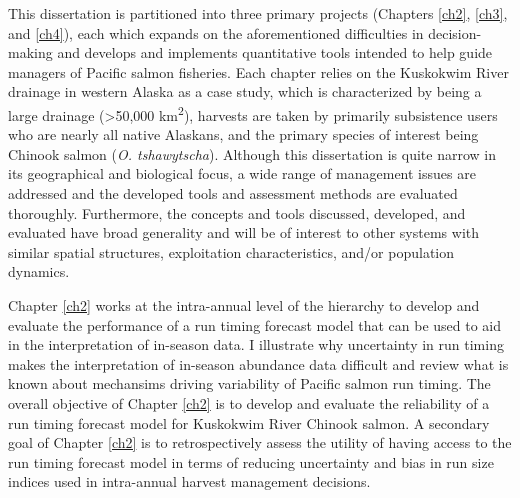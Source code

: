 \documentclass[12pt,]{book}
\theoremstyle{definition}
\theoremstyle{definition}
\theoremstyle{definition}
\theoremstyle{remark}
\begin{document}
This dissertation is partitioned into three primary projects (Chapters
\ref{ch2}, \ref{ch3}, and \ref{ch4}), each which expands on the
aforementioned difficulties in decision-making and develops and
implements quantitative tools intended to help guide managers of Pacific
salmon fisheries. Each chapter relies on the Kuskokwim River drainage in
western Alaska as a case study, which is characterized by being a large
drainage (\textgreater{}50,000 km\textsuperscript{2}), harvests are
taken by primarily subsistence users who are nearly all native Alaskans,
and the primary species of interest being Chinook salmon (\emph{O.
tshawytscha}). Although this dissertation is quite narrow in its
geographical and biological focus, a wide range of management issues are
addressed and the developed tools and assessment methods are evaluated
thoroughly. Furthermore, the concepts and tools discussed, developed,
and evaluated have broad generality and will be of interest to other
systems with similar spatial structures, exploitation characteristics,
and/or population dynamics.

Chapter \ref{ch2} works at the intra-annual level of the hierarchy to
develop and evaluate the performance of a run timing forecast model that
can be used to aid in the interpretation of in-season data. I illustrate
why uncertainty in run timing makes the interpretation of in-season
abundance data difficult and review what is known about mechansims
driving variability of Pacific salmon run timing. The overall objective
of Chapter \ref{ch2} is to develop and evaluate the reliability of a run
timing forecast model for Kuskokwim River Chinook salmon. A secondary
goal of Chapter \ref{ch2} is to retrospectively assess the utility of
having access to the run timing forecast model in terms of reducing
uncertainty and bias in run size indices used in intra-annual harvest
management decisions.
\end{document}
